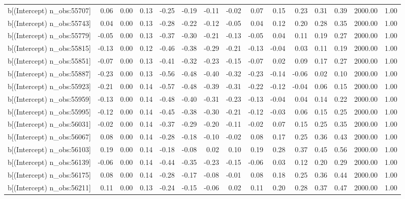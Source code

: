 \begin{table}[ht]
\begin{tabular}{rrrrrrrrrrrrrrr}
  b[(Intercept) n\_obs:55707] & 0.06 & 0.00 & 0.13 & -0.25 & -0.19 & -0.11 & -0.02 & 0.07 & 0.15 & 0.23 & 0.31 & 0.39 & 2000.00 & 1.00 \\ 
  b[(Intercept) n\_obs:55743] & 0.04 & 0.00 & 0.13 & -0.28 & -0.22 & -0.12 & -0.05 & 0.04 & 0.12 & 0.20 & 0.28 & 0.35 & 2000.00 & 1.00 \\ 
  b[(Intercept) n\_obs:55779] & -0.05 & 0.00 & 0.13 & -0.37 & -0.30 & -0.21 & -0.13 & -0.05 & 0.04 & 0.11 & 0.19 & 0.27 & 2000.00 & 1.00 \\ 
  b[(Intercept) n\_obs:55815] & -0.13 & 0.00 & 0.12 & -0.46 & -0.38 & -0.29 & -0.21 & -0.13 & -0.04 & 0.03 & 0.11 & 0.19 & 2000.00 & 1.00 \\ 
  b[(Intercept) n\_obs:55851] & -0.07 & 0.00 & 0.13 & -0.41 & -0.32 & -0.23 & -0.15 & -0.07 & 0.02 & 0.09 & 0.17 & 0.27 & 2000.00 & 1.00 \\ 
  b[(Intercept) n\_obs:55887] & -0.23 & 0.00 & 0.13 & -0.56 & -0.48 & -0.40 & -0.32 & -0.23 & -0.14 & -0.06 & 0.02 & 0.10 & 2000.00 & 1.00 \\ 
  b[(Intercept) n\_obs:55923] & -0.21 & 0.00 & 0.14 & -0.57 & -0.48 & -0.39 & -0.31 & -0.22 & -0.12 & -0.04 & 0.06 & 0.15 & 2000.00 & 1.00 \\ 
  b[(Intercept) n\_obs:55959] & -0.13 & 0.00 & 0.14 & -0.48 & -0.40 & -0.31 & -0.23 & -0.13 & -0.04 & 0.04 & 0.14 & 0.22 & 2000.00 & 1.00 \\ 
  b[(Intercept) n\_obs:55995] & -0.12 & 0.00 & 0.14 & -0.45 & -0.38 & -0.30 & -0.21 & -0.12 & -0.03 & 0.06 & 0.15 & 0.25 & 2000.00 & 1.00 \\ 
  b[(Intercept) n\_obs:56031] & -0.02 & 0.00 & 0.14 & -0.37 & -0.29 & -0.20 & -0.11 & -0.02 & 0.07 & 0.15 & 0.25 & 0.35 & 2000.00 & 1.00 \\ 
  b[(Intercept) n\_obs:56067] & 0.08 & 0.00 & 0.14 & -0.28 & -0.18 & -0.10 & -0.02 & 0.08 & 0.17 & 0.25 & 0.36 & 0.43 & 2000.00 & 1.00 \\ 
  b[(Intercept) n\_obs:56103] & 0.19 & 0.00 & 0.14 & -0.18 & -0.08 & 0.02 & 0.10 & 0.19 & 0.28 & 0.37 & 0.45 & 0.56 & 2000.00 & 1.00 \\ 
  b[(Intercept) n\_obs:56139] & -0.06 & 0.00 & 0.14 & -0.44 & -0.35 & -0.23 & -0.15 & -0.06 & 0.03 & 0.12 & 0.20 & 0.29 & 2000.00 & 1.00 \\ 
  b[(Intercept) n\_obs:56175] & 0.08 & 0.00 & 0.14 & -0.28 & -0.17 & -0.08 & -0.01 & 0.08 & 0.18 & 0.25 & 0.36 & 0.44 & 2000.00 & 1.00 \\ 
  b[(Intercept) n\_obs:56211] & 0.11 & 0.00 & 0.13 & -0.24 & -0.15 & -0.06 & 0.02 & 0.11 & 0.20 & 0.28 & 0.37 & 0.47 & 2000.00 & 1.00 \\ 

\end{tabular}
\end{table}

